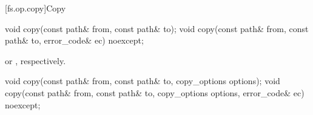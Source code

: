 [fs.op.copy]{Copy}

\begin{itemdecl}
void copy(const path& from, const path& to);
void copy(const path& from, const path& to, error_code& ec) noexcept;
\end{itemdecl}

\begin{itemdescr}
\pnum
\effects {}
or , respectively.
\end{itemdescr}

\begin{itemdecl}
void copy(const path& from, const path& to, copy_options options);
void copy(const path& from, const path& to, copy_options options,
          error_code& ec) noexcept;
\end{itemdecl}

